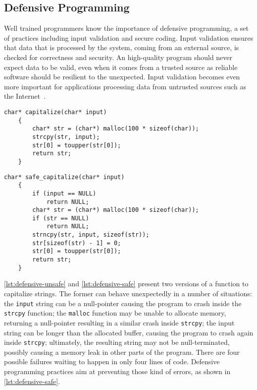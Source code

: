 \subsection{Defensive Programming}
Well trained programmers know the importance of defensive programming, a set of
practices including input validation and secure coding. Input validation ensures
that data that is processed by the system, coming from an external source, is
checked for correctness and security. An high-quality program should never
expect data to be valid, even when it comes from a trusted source as reliable
software should be resilient to the unexpected. Input validation becomes even
more important for applications processing data from untrusted sources such as
the Internet~\cite{scholte2012have}.

\begin{lstlisting}[caption={Defensive programming: unsafe example},
                   label=lst:defensive-unsafe,float,floatplacement=h]
    char* capitalize(char* input)
    {
        char* str = (char*) malloc(100 * sizeof(char));
        strcpy(str, input);
        str[0] = toupper(str[0]);
        return str;
    }
\end{lstlisting}
\begin{lstlisting}[caption={Defensive programming: safe example},
                   label=lst:defensive-safe,float,floatplacement=h]
    char* safe_capitalize(char* input)
    {
        if (input == NULL)
            return NULL;
        char* str = (char*) malloc(100 * sizeof(char));
        if (str == NULL)
            return NULL;
        strncpy(str, input, sizeof(str));
        str[sizeof(str) - 1] = 0;
        str[0] = toupper(str[0]);
        return str;
    }
\end{lstlisting}

\autoref{lst:defensive-unsafe} and \autoref{lst:defensive-safe} present
two versions of a function to capitalize strings. The former can behave
unexpectedly in a number of situations: the \texttt{input} string can be a
null-pointer causing the program to crash inside the \texttt{strcpy} function;
the \texttt{malloc} function may be unable to allocate memory, returning a
null-pointer resulting in a similar crash inside \texttt{strcpy}; the input
string can be longer than the allocated buffer, causing the program to crash
again inside \texttt{strcpy}; ultimately, the resulting string may not be
null-terminated, possibly causing a memory leak in other parts of the program.
There are four possible failures waiting to happen in only four lines of code.
Defensive programming practices aim at preventing those kind of errors, as shown
in \autoref{lst:defensive-safe}.

